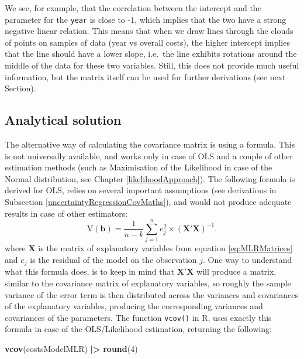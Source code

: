 \documentclass[
]{book}
\newenvironment{Shaded}{\begin{snugshade}}{\end{snugshade}}
\newcommand{\DecValTok}[1]{\textcolor[rgb]{0.00,0.00,0.81}{#1}}
\newcommand{\FunctionTok}[1]{\textcolor[rgb]{0.13,0.29,0.53}{\textbf{#1}}}
\newcommand{\NormalTok}[1]{#1}
\newcommand{\SpecialCharTok}[1]{\textcolor[rgb]{0.81,0.36,0.00}{\textbf{#1}}}
\theoremstyle{definition}
\theoremstyle{definition}
\theoremstyle{definition}
\theoremstyle{definition}
\theoremstyle{remark}
\begin{document}
We see, for example, that the correlation between the intercept and the parameter for the \texttt{year} is close to -1, which implies that the two have a strong negative linear relation. This means that when we draw lines through the clouds of points on samples of data (year vs overall costs), the higher intercept implies that the line should have a lower slope, i.e.~the line exhibits rotations around the middle of the data for these two variables. Still, this does not provide much useful information, but the matrix itself can be used for further derivations (see next Section).

\subsection{Analytical solution}\label{analytical-solution}

The alternative way of calculating the covariance matrix is using a formula. This is not universally available, and works only in case of OLS and a couple of other estimation methods (such as Maximisation of the Likelihood in case of the Normal distribution, see Chapter \ref{likelihoodApproach}). The following formula is derived for OLS, relies on several important assumptions (see derivations in Subsection \ref{uncertaintyRegressionCovMaths}), and would not produce adequate results in case of other estimators:
\begin{equation}
\mathrm{V}({\boldsymbol{b}}) = \frac{1}{n-k} \sum_{j=1}^n e_j^2 \times \left(\mathbf{X}' \mathbf{X}\right)^{-1}.
\label{eq:MLRcovarianceMatrix}
\end{equation}
where \(\mathbf{X}\) is the matrix of explanatory variables from equation \eqref{eq:MLRMatrices} and \(e_j\) is the residual of the model on the observation \(j\). One way to understand what this formula does, is to keep in mind that \(\mathbf{X}' \mathbf{X}\) will produce a matrix, similar to the covariance matrix of explanatory variables, so roughly the sample variance of the error term is then distributed across the variances and covariances of the explanatory variables, producing the corresponding variances and covariances of the parameters. The function \texttt{vcov()} in R, uses exactly this formula in case of the OLS/Likelihood estimation, returning the following:

\begin{Shaded}
\begin{Highlighting}[]
\FunctionTok{vcov}\NormalTok{(costsModelMLR) }\SpecialCharTok{|\textgreater{}} \FunctionTok{round}\NormalTok{(}\DecValTok{4}\NormalTok{)}
\end{Highlighting}
\end{Shaded}
\end{document}
